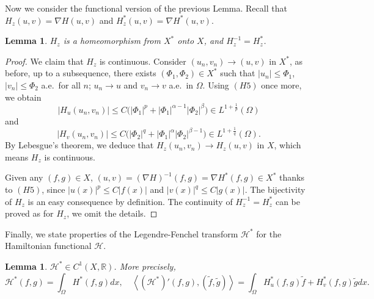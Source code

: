\documentclass[10pt]{article}
\numberwithin{equation}{section}
\newtheorem{lemma}[theorem]{Lemma}
\numberwithin{equation}{section}
\begin{document}
Now we consider the functional version of the previous Lemma.  Recall that $H_z(u, v) = \nabla H(u, v)$ and $H_z^*(u, v) = \nabla H^*(u, v)$.
\begin{lemma}\label{2302260102}
$H_z$ is a homeomorphism from $X^*$ onto $X$, and $H_z^{-1}= H_z^*$.
\end{lemma}
\begin{proof}
We claim that $H_z$ is continuous. Consider $(u_n, v_n)\to (u, v)$ in $X^*$, as before, up to a subsequence, there exists $(\Phi_1, \Phi_2)\in X^*$ such that $|u_n|\le \Phi_1$, $|v_n|\le \Phi_2$ a.e.~for all $n$; $u_n \to u$ and $v_n \to v$ a.e.~in $\Omega$. Using $(H5)$ once more, we obtain
\[
|H_u(u_n, v_n)|\le C\Big(|\Phi_1|^p+ |\Phi_1|^{\alpha-1}|\Phi_2|^{\beta}\Big)\in L^{1+\frac1p}(\Omega)
\]
and 
\[
|H_v(u_n, v_n)| \le C\Big(|\Phi_2|^q+ |\Phi_1|^{\alpha}|\Phi_2|^{\beta-1}\Big) \in L^{1+\frac1q}(\Omega).
\]
By Lebesgue's theorem, we deduce that $H_z(u_n, v_n) \to H_z(u, v)$ in $X$, which means $H_z$ is continuous.

Given any $(f, g)\in X$, $(u, v)= (\nabla H)^{-1}(f, g) = \nabla H^*(f, g) \in X^*$ thanks to $(H5)$, since $|u(x)|^p \leq C|f(x)|$ and $|v(x)|^q \leq C|g(x)|$. The bijectivity of $H_z$ is an easy consequence by definition. The continuity of $H_z^{-1} = H^*_z$ can be proved as for $H_z$, we omit the details. 
\end{proof}

Finally, we state properties of the Legendre-Fenchel transform $\mathcal{H}^*$ for the Hamiltonian functional $\mathcal{H}$.
\begin{lemma}\label{2211072137}
$\mathcal{H}^{*}\in C^1(X, \mathbb{R})$. More precisely,
\begin{equation}\label{2211052325}
\mathcal{H}^{*}(f, g)=\int_{\Omega}H^*(f, g) dx, \quad 
\left\langle (\mathcal{H}^{*})'(f, g), (\widetilde{f}, \widetilde{g}) \right\rangle=\int_{\Omega}H^*_u(f, g) \widetilde{f}+H^*_v(f, g)\widetilde{g} dx.
\end{equation}
\end{lemma}
\end{document}
